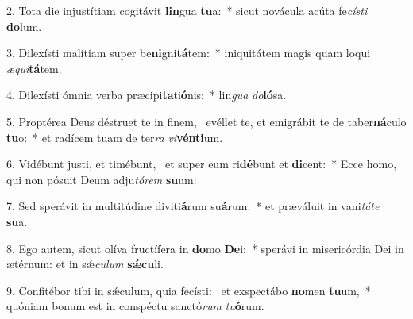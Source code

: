 2. Tota die injustítiam cogitávit \textbf{lin}gua \textbf{tu}a:~*  sicut novácula acúta fe\textit{cís}\textit{ti} \textbf{do}lum.\

3. Dilexísti malítiam super be\textbf{ni}gni\textbf{tá}tem:~*  iniquitátem magis quam loqui \textit{æ}\textit{qui}\textbf{tá}tem.\

4. Dilexísti ómnia verba præcipi\textbf{ta}ti\textbf{ó}nis:~*  lin\textit{gua} \textit{do}\textbf{ló}sa.\

5. Proptérea Deus déstruet te in finem, \dag\  evéllet te, et emigrábit te de taber\textbf{ná}culo \textbf{tu}o:~*  et radícem tuam de ter\textit{ra} \textit{vi}\textbf{vén}\textbf{ti}um.\

6. Vidébunt justi, et timébunt, \dag\  et super eum ri\textbf{dé}bunt et \textbf{di}cent:~*  Ecce homo, qui non pósuit Deum adju\textit{tó}\textit{rem} \textbf{su}um:\

7. Sed sperávit in multitúdine diviti\textbf{á}rum su\textbf{á}rum:~*  et præváluit in vani\textit{tá}\textit{te} \textbf{su}a.\

8. Ego autem, sicut olíva fructífera in \textbf{do}mo \textbf{De}i:~*  sperávi in misericórdia Dei in ætérnum: et in sǽ\textit{cu}\textit{lum} \textbf{sǽ}\textbf{cu}li.\

9. Confitébor tibi in sǽculum, quia fecísti: \dag\  et exspectábo \textbf{no}men \textbf{tu}um,~*  quóniam bonum est in conspéctu sanctó\textit{rum} \textit{tu}\textbf{ó}rum.\

